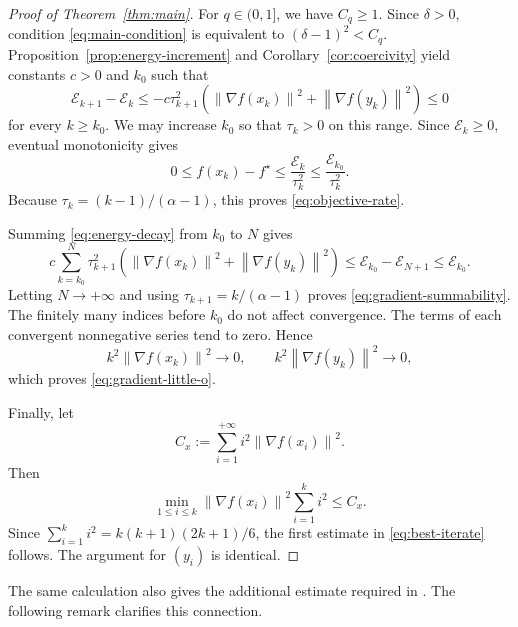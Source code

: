 \documentclass[11pt]{article}
\theoremstyle{plain}
\theoremstyle{definition}
\newcommand{\norm}[1]{\left\lVert #1\right\rVert}
\begin{document}
\begin{proof}[Proof of Theorem~\ref{thm:main}]
For $q\in(0,1]$, we have $C_q\geq1$. Since $\delta>0$, condition
\eqref{eq:main-condition} is equivalent to
$(\delta-1)^2<C_q$. Proposition~\ref{prop:energy-increment} and
Corollary~\ref{cor:coercivity} yield constants $c>0$ and $k_0$ such that
\begin{equation}
\label{eq:energy-decay}
\mathcal E_{k+1}-\mathcal E_k
\leq-c\tau_{k+1}^2
\left(\norm{\nabla f(x_k)}^2+\norm{\nabla f(y_k)}^2\right)
\leq0
\end{equation}
for every $k\geq k_0$. We may increase $k_0$ so that $\tau_k>0$ on this
range. Since $\mathcal E_k\geq0$, eventual monotonicity gives
$$
0\leq f(x_k)-f^\star
\leq\frac{\mathcal E_k}{\tau_k^2}
\leq\frac{\mathcal E_{k_0}}{\tau_k^2}.
$$
Because $\tau_k=(k-1)/(\alpha-1)$, this proves
\eqref{eq:objective-rate}.

Summing \eqref{eq:energy-decay} from $k_0$ to $N$ gives
$$
c\sum_{k=k_0}^{N}\tau_{k+1}^2
\left(\norm{\nabla f(x_k)}^2+\norm{\nabla f(y_k)}^2\right)
\leq\mathcal E_{k_0}-\mathcal E_{N+1}
\leq\mathcal E_{k_0}.
$$
Letting $N\to+\infty$ and using
$\tau_{k+1}=k/(\alpha-1)$ proves \eqref{eq:gradient-summability}. The
finitely many indices before $k_0$ do not affect convergence. The terms of
each convergent nonnegative series tend to zero. Hence
$$
k^2\norm{\nabla f(x_k)}^2\longrightarrow0,
\qquad
k^2\norm{\nabla f(y_k)}^2\longrightarrow0,
$$
which proves \eqref{eq:gradient-little-o}.

Finally, let
$$
C_x:=\sum_{i=1}^{+\infty}i^2\norm{\nabla f(x_i)}^2.
$$
Then
$$
\min_{1\leq i\leq k}\norm{\nabla f(x_i)}^2
\sum_{i=1}^ki^2\leq C_x.
$$
Since $\sum_{i=1}^ki^2=k(k+1)(2k+1)/6$, the first estimate in
\eqref{eq:best-iterate} follows. The argument for $(y_i)$ is identical.
\end{proof}

The same calculation also gives the additional estimate required in \cite{ACFR2023}. The following remark clarifies this connection.
\end{document}
